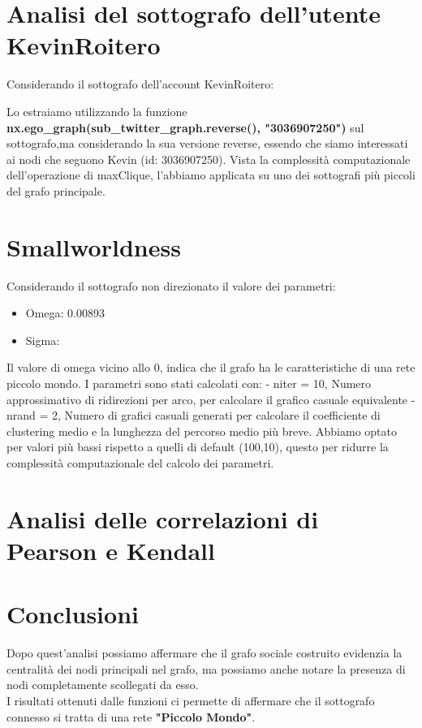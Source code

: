 \documentclass[a4paper,11pt]{report}
\begin{document}
\section{Analisi del sottografo dell'utente KevinRoitero}
Considerando il sottografo dell'account KevinRoitero:

Lo estraiamo utilizzando la funzione \textbf{nx.ego\_graph(sub\_twitter\_graph.reverse(), "3036907250")} sul sottografo,ma considerando la sua versione reverse, essendo che siamo interessati ai nodi che seguono Kevin (id: 3036907250).
Vista la complessità computazionale dell'operazione di maxClique, l'abbiamo applicata su uno dei sottografi più piccoli del grafo principale. 

\section{Smallworldness}
Considerando il sottografo non direzionato il valore dei parametri:
	\begin{itemize}
	\item Omega: 0.00893
	\item Sigma: 
\end{itemize}
Il valore di omega vicino allo 0, indica che il grafo ha le caratteristiche di una rete piccolo mondo.
I parametri sono stati calcolati con:\newline
- niter = 10, Numero approssimativo di ridirezioni per arco, per calcolare il grafico casuale equivalente\newline
- nrand = 2, Numero di grafici casuali generati per calcolare il coefficiente di clustering medio e la lunghezza del percorso medio più breve.\newline
Abbiamo optato per valori più bassi rispetto a quelli di default (100,10), questo per ridurre la complessità computazionale del calcolo dei parametri.

\section{Analisi delle correlazioni di Pearson e Kendall}


\pagebreak

\section{Conclusioni}
Dopo quest'analisi possiamo affermare che il grafo sociale costruito evidenzia la centralità dei nodi principali nel grafo, ma possiamo anche notare la presenza di nodi completamente scollegati da esso.\\
I risultati ottenuti dalle funzioni ci permette di affermare che il sottografo connesso si tratta di una rete \textbf{"Piccolo Mondo"}. \\
\pagebreak
\end{document}
